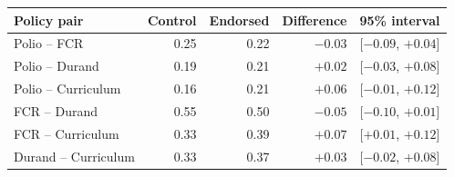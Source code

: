 \begin{tabular}{lrrrr}
\toprule
Policy pair & Control & Endorsed & Difference & 95\% interval \\
\midrule
Polio -- FCR & 0.25 & 0.22 & $-0.03$ & [$-0.09$, $+0.04$] \\
Polio -- Durand & 0.19 & 0.21 & $+0.02$ & [$-0.03$, $+0.08$] \\
Polio -- Curriculum & 0.16 & 0.21 & $+0.06$ & [$-0.01$, $+0.12$] \\
FCR -- Durand & 0.55 & 0.50 & $-0.05$ & [$-0.10$, $+0.01$] \\
FCR -- Curriculum & 0.33 & 0.39 & $+0.07$ & [$+0.01$, $+0.12$] \\
Durand -- Curriculum & 0.33 & 0.37 & $+0.03$ & [$-0.02$, $+0.08$] \\
\bottomrule
\end{tabular}
